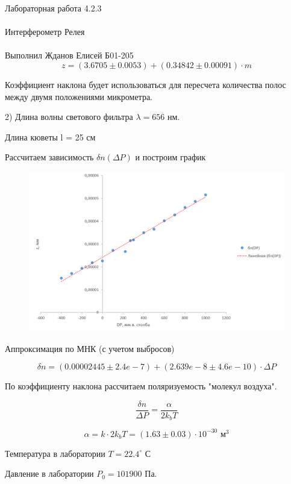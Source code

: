\documentclass{astroedu-lab}
\begin{document}
\begin{problem}{\huge Лабораторная работа 4.2.3\\\\Интерферометр Релея\\\\Выполнил Жданов Елисей Б01-205}
\begin{equation}
	z = (3.6705 \pm 0.0053) + (0.34842 \pm 0.00091) \cdot m
\end{equation}

Коэффициент наклона будет использоваться для пересчета количества полос между двумя положениями микрометра.

2) Длина волны светового фильтра $\lambda = 656$ нм.

Длина кюветы l = 25 см

Рассчитаем зависимость $\delta n (\Delta P)$ и построим график

\begin{figure}[!h]
	\centering
	\includegraphics[width=1\textwidth]{dnDP.png}
	\label{fig:boiler}
\end{figure}

Аппроксимация по МНК (с учетом выбросов)

\begin{equation}
	\delta n = (0.00002445 ± 2.4e-7) + (2.639e-8 ± 4.6e-10)\cdot \Delta P
\end{equation}

По коэффициенту наклона рассчитаем поляризуемость "молекул воздуха".

\begin{equation}
	\frac{\delta n}{\Delta P} = \frac{\alpha}{2 k_b T}
\end{equation}

\begin{equation}
	\alpha = k \cdot 2 k_b T = (1.63 \pm 0.03) \cdot 10^{-30} \text{ м}^3
\end{equation}

Температура в лаборатории $T = 22.4 ^\circ$ С 

Давление в лаборатории $P_0 = 101900$ Па.


\end{problem}
\end{document}
